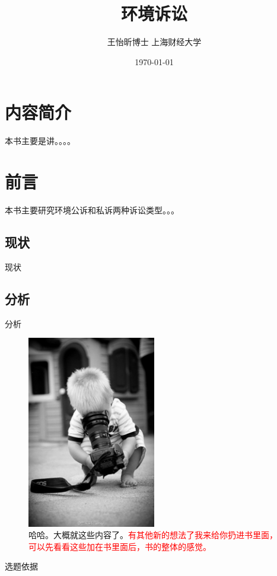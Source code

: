 \documentclass[12pt, a4paper]{ctexbook}
\title{\textbf{环境诉讼}}
\author{王怡昕博士 \quad 上海财经大学}
\date{\today}
\begin{document}
\maketitle
\thispagestyle{empty}

\frontmatter
\chapter{内容简介}
本书主要是讲。。。。

\newpage

\tableofcontents
\newpage

\pagestyle{fancy}
\fancyhead{} %

\mainmatter

\chapter{前言}
本书主要研究环境公诉和私诉两种诉讼类型。。。
\section{现状}
现状
\section{分析}
分析

\begin{figure}
    \centering
    \includegraphics[width=0.5\textwidth]{figures/boy.jpg}
    \caption{\label{boy}哈哈。大概就这些内容了。\LARGE\textcolor{red}{有其他新的想法了我来给你扔进书里面，可以先看看这些加在书里面后，书的整体的感觉。}}

\end{figure}
选题依据  
\end{document}
